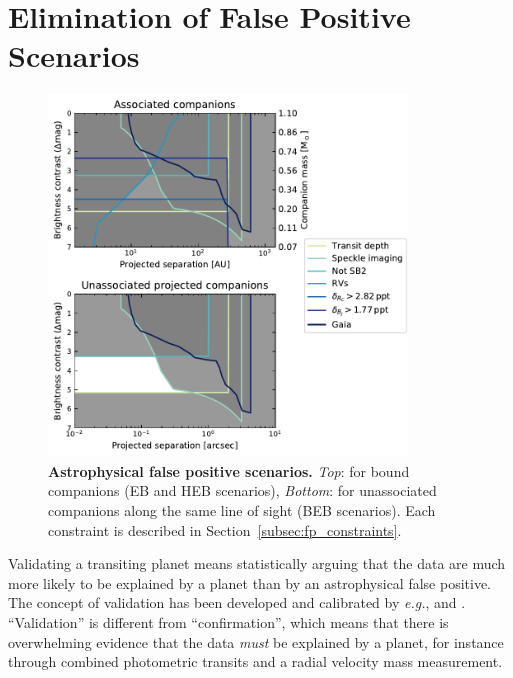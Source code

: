 \documentclass[12pt,twocolumn,tighten]{aastex63}
\begin{document}
\section{Elimination of False Positive Scenarios}
\label{sec:validation}

\begin{figure}[!t]
	\begin{center}
		\leavevmode
		\includegraphics[width=0.85\textwidth]{f4.pdf}
	\end{center}
	\vspace{-0.7cm}
	\caption{
		{\bf Astrophysical false positive scenarios.}
    {\it Top}: for bound companions (EB and HEB scenarios),
		{\it Bottom}: for unassociated companions along the same line of
    sight (BEB scenarios).
		Each constraint is described in Section~\ref{subsec:fp_constraints}.
		\label{fig:fpscenario}
	}
\end{figure}

Validating a transiting planet means statistically arguing that the
data are much more likely to be explained by a planet than by an
astrophysical false positive. The concept of validation has been
developed and calibrated by {\it e.g.},
\citet{torres_modeling_2011,morton_efficient_2012,diaz_pastis_2014,santerne_pastis_2015,morton_false_2016}
and \citet{giacalone_triceratops_2020}.  ``Validation'' is different
from ``confirmation'', which means that there is overwhelming evidence
that the data {\it must} be explained by a planet, for instance
through combined photometric transits and a radial velocity mass
measurement.
\end{document}
